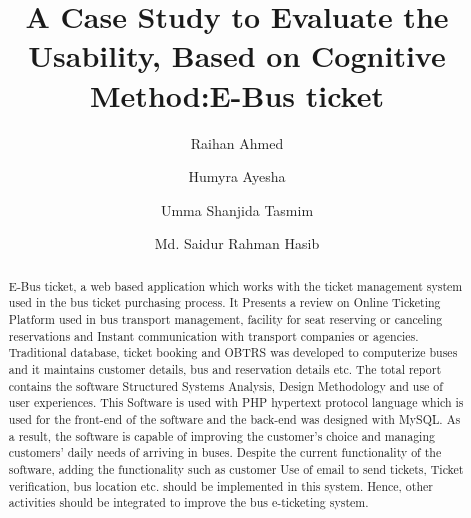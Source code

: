 \documentclass[runningheads]{llncs}
\begin{document}
\title{A Case Study to Evaluate the Usability, Based on Cognitive Method:E-Bus ticket}

\author{Raihan Ahmed \and
Humyra Ayesha  \and
Umma Shanjida Tasmim \and
Md. Saidur Rahman Hasib}


\maketitle              
\begin{abstract}
E-Bus ticket, a web based application which works with the ticket management system  used in the bus ticket purchasing process. It Presents a review on Online Ticketing Platform used in bus transport management, facility for seat reserving or canceling reservations and Instant communication with transport companies or agencies. Traditional database, ticket booking and OBTRS was developed to computerize buses and it maintains customer details, bus and reservation details etc. The total report contains the software Structured Systems Analysis, Design Methodology and use of user experiences. This Software is used with PHP hypertext protocol language which is used for the front-end of the software and the back-end was designed with MySQL. As a result, the software is capable of improving the customer's choice and  managing customers' daily needs of arriving in buses. Despite the current functionality of the software, adding the functionality such as customer Use of email to send tickets, Ticket verification, bus location etc. should be implemented in this system. Hence, other activities should be integrated to improve the bus e-ticketing system.

\end{abstract}
\end{document}
